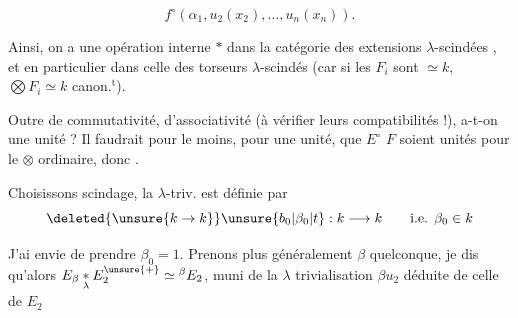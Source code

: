 \[
 f^\circ(\alpha_1,u_2(x_2),\ldots,u_n(x_n)).
\]

Ainsi, on a une opération interne $*$ dans la catégorie des extensions $\lambda$-scindées , et en particulier dans celle des torseurs $\lambda$-scindés (car si les $F_i$ sont $\simeq k$, $\bigotimes F_i\simeq k$ canon.$^{\mathrm t}$).

 Outre   de commutativité, d'associativité (à vérifier leurs compatibilités !), a-t-on une unité ? Il faudrait pour le moins,  pour une unité, 
que $E^\circ$  $F$ soient unités pour le $\otimes$ ordinaire, donc  .

 Choisissons scindage,  la $\lambda$-triv. est définie par
\[
 \deleted{\unsure{k\to k}}\unsure{b_0|\beta_0|t}:k\longrightarrow k\qquad\text{i.e. }\beta_0\in k
\]

J'ai envie de prendre $\beta_0=1$. Prenons plus généralement $\beta$ quelconque, je dis qu'alors $E_\beta\mathbin{\underset{\lambda}{*}}E_2^{\unsure{+}}\simeq{}^{\beta}E_2$, muni de la $\lambda$ trivialisation $\beta u_2$ déduite de celle de $E_2$
